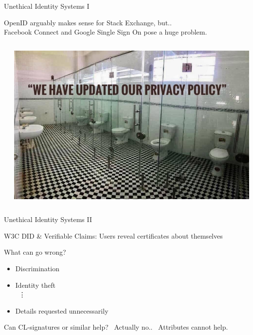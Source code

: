 \documentclass[fleqn,xcolor={usenames,dvipsnames},notes,aspectratio=169]{beamer} %
\begin{document}
\begin{frame}{Unethical Identity Systems I}

OpenID arguably makes sense for Stack Exchange, but.. \\
\hspace*{40pt}  Facebook Connect and Google Single Sign On pose a huge problem.

\bigskip

\begin{columns}
\begin{column}[t]{0.1\textwidth}
\end{column}
\begin{column}[t]{0.9\textwidth}
\includegraphics[width=.8\textwidth]{../pics/OpenID.jpeg}
\end{column}
\end{columns}

\end{frame}



\begin{frame}{Unethical Identity Systems II}

\medskip

W3C DID \& Verifiable Claims:  Users reveal certificates about themselves

\bigskip
\bigskip

What can go wrong? \\ \smallskip

\begin{itemize}
\item Discrimination 
\item Identity theft \\ \, \vdots
\item Details requested unnecessarily
\end{itemize}

\pause
\bigskip
\bigskip
\bigskip


Can CL-signatures or similar help? \, Actually no.. \, Attributes cannot help.

\end{frame}
\end{document}
